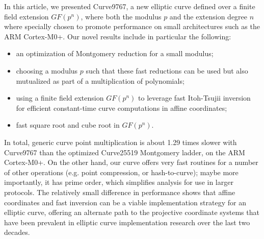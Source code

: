 \documentclass{llncs}
\newcommand{\GF}{GF}
\begin{document}
In this article, we presented Curve9767, a new elliptic curve defined
over a finite field extension $\GF(p^n)$, where both the modulus $p$ and
the extension degree $n$ where specially chosen to promote performance
on small architectures such as the ARM Cortex-M0+. Our novel results
include in particular the following:
\begin{itemize}

    \item an optimization of Montgomery reduction for a small modulus;

    \item choosing a modulus $p$ such that these fast reductions can be
    used but also mutualized as part of a multiplication of polynomials;

    \item using a finite field extension $\GF(p^n)$ to leverage fast
    Itoh-Tsujii inversion for efficient constant-time curve computations
    in affine coordinates;

    \item fast square root and cube root in $\GF(p^n)$.

\end{itemize}

In total, generic curve point multiplication is about 1.29 times slower
with Curve9767 than the optimized Curve25519 Montgomery ladder, on the
ARM Cortex-M0+. On the other hand, our curve offers very fast routines
for a number of other operations (e.g. point compression, or
hash-to-curve); maybe more importantly, it has prime order, which
simplifies analysis for use in larger protocols. The relatively small
difference in performance shows that affine coordinates and fast
inversion can be a viable implementation strategy for an elliptic curve,
offering an alternate path to the projective coordinate systems that
have been prevalent in elliptic curve implementation research over the
last two decades.
\end{document}
